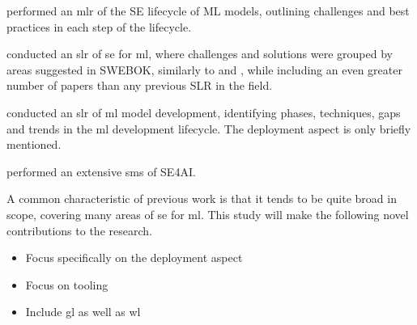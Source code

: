 \textcite{John2021} performed an \acrshort{mlr} of the SE lifecycle of ML models, outlining challenges and best practices in each step of the lifecycle.

\textcite{Giray2021} conducted an \acrshort{slr} of \acrshort{se} for \acrshort{ml}, where challenges and solutions were grouped by areas suggested in SWEBOK, similarly to \cite{Kumeno2020} and \cite{Nascimento2020}, while including an even greater number of papers than any previous SLR in the field.

\textcite{Lorenzoni2021} conducted an \acrshort{slr} of \acrshort{ml} model development, identifying phases, techniques, gaps and trends in the \acrshort{ml} development lifecycle.
The deployment aspect is only briefly mentioned.

\textcite{MartinezFernandez2021} performed an extensive \acrshort{sms} of SE4AI.


A common characteristic of previous work is that it tends to be quite broad in scope, covering many areas of \acrshort{se} for \acrshort{ml}.
This study will make the following novel contributions to the research.
\begin{itemize}
    \item Focus specifically on the deployment aspect
    \item Focus on tooling
    \item Include \acrshort{gl} as well as \acrshort{wl}
\end{itemize}

